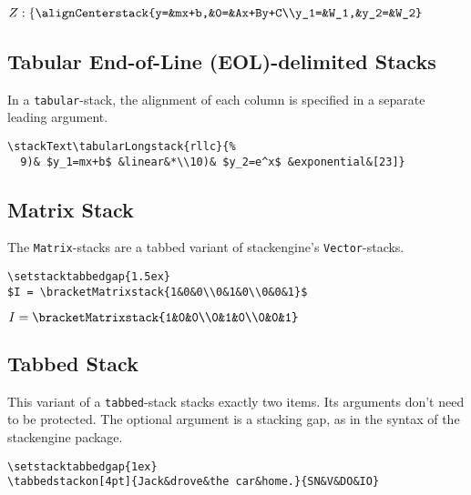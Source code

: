 \documentclass{article}
\begin{document}
{\small\stackMath$Z:\left\{\alignCenterstack{y=&mx+b,&0=&Ax+By+C\\y_1=&W_1,&y_2=&W_2}\right.$}

\subsection*{Tabular End-of-Line (EOL)-delimited Stacks}

In a \texttt{tabular}-stack, the alignment of each column is specified in a separate
leading argument.

\verb|\stackText\tabularLongstack{rllc}{%|\\
\verb|  9)& $y_1=mx+b$ &linear&*\\10)& $y_2=e^x$ &exponential&[23]}|

{\small\stackText{}}

\subsection*{Matrix Stack}

The \texttt{Matrix}-stacks are a tabbed variant of \textsf{stackengine}'s \texttt{Vector}-stacks.

\verb|\setstacktabbedgap{1.5ex}|\\
\verb|$I = \bracketMatrixstack{1&0&0\\0&1&0\\0&0&1}$|

{\small\setstacktabbedgap{1.5ex} $I = \bracketMatrixstack{1&0&0\\0&1&0\\0&0&1}$}

\subsection*{Tabbed Stack}

This variant of a \texttt{tabbed}-stack stacks exactly two items.  
Its arguments don't need to be protected.  The optional argument is a stacking gap,
as in the syntax of the \textsf{stackengine} package.

\verb|\setstacktabbedgap{1ex}|\\
\verb|\tabbedstackon[4pt]{Jack&drove&the car&home.}{SN&V&DO&IO}|

{\small\stackText\setstacktabbedgap{1ex}}
\end{document}
